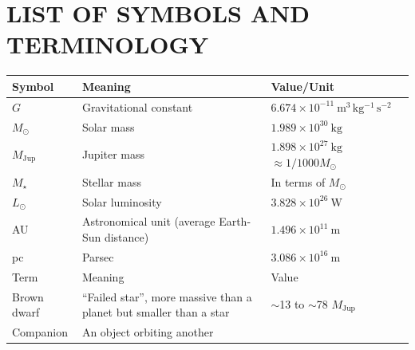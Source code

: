 \documentclass[11pt]{report}
\begin{document}
\chapter*{LIST OF SYMBOLS AND TERMINOLOGY}
\begin{singlespace}
\begin{center}
\begin{tabularx}{\textwidth}{@{}l >{\raggedright\arraybackslash}X l@{}}
\toprule
Symbol & Meaning & Value/Unit \\
\midrule
$G$              & Gravitational constant     & $6.674\times10^{-11}\ \mathrm{m^{3}\,kg^{-1}\,s^{-2}}$ \\
$M_\odot$        & Solar mass                 & $1.989\times10^{30}\ \mathrm{kg}$ \\
$M_\mathrm{Jup}$ & Jupiter mass               & $1.898\times10^{27}\ \mathrm{kg}$ \ $\approx 1/1000M_\odot$ \\
$M_\star$        & Stellar mass               & In terms of $M_\odot$ \\
$L_\odot$        & Solar luminosity           & $3.828\times10^{26}\ \mathrm{W}$ \\
AU               & Astronomical unit (average Earth-Sun distance)          & $1.496\times10^{11}\ \mathrm{m}$ \\
pc               & Parsec                     & $3.086\times10^{16}\ \mathrm{m}$ \\
\bottomrule
\toprule
Term & Meaning & Value \\
\midrule
Brown dwarf & ``Failed star'', more massive than a planet but smaller than a star & $\sim$13 to $\sim$78 $M_\mathrm{Jup}$ \\
Companion   & An object orbiting another       \\
\bottomrule
\end{tabularx}
\end{center}
\end{singlespace}

\end{document}
